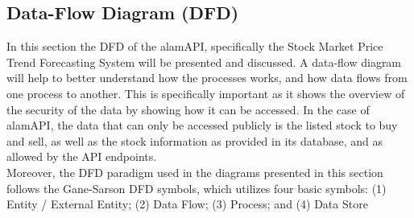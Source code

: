 \subsection{Data-Flow Diagram (DFD)}
\label{subsec:dfd}
In this section the DFD of the alamAPI, specifically the Stock 
Market Price Trend Forecasting System will be presented and discussed. 
A data-flow diagram will help to better understand how the processes works, 
and how data flows from one process to another. This is specifically important 
as it shows the overview of the security of the data by showing how it can be 
accessed. In the case of alamAPI, the data that can only be accessed publicly is 
the listed stock to buy and sell, as well as the stock information as provided 
in its database, and as allowed by the API endpoints.
\hfill \\

Moreover, the DFD paradigm used in the diagrams presented in this 
section follows the Gane-Sarson DFD symbols, which utilizes four basic symbols: 
(1) Entity / External Entity; 
(2) Data Flow; 
(3) Process; and 
(4) Data Store 
\cite{VisualParadigm}

